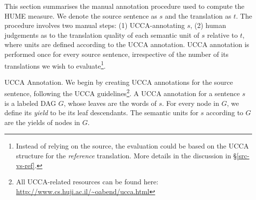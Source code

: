 \documentclass[11pt,letterpaper]{article}
\makeatletter
\renewcommand{\paragraph}{
  \@startsection{paragraph}{4}
  {\z@}{.1ex \@plus .1ex \@minus .1ex}{-1.5em}
  {\normalfont\normalsize\bfseries}
}
\newcommand{\secref}[1]{\S\ref{#1}}
\makeatother
\begin{document}
This section summarises the manual annotation procedure used
to compute the HUME measure. 
We denote the source sentence as $s$ and the translation as $t$. 
The procedure involves two manual steps: (1) UCCA-annotating $s$, 
(2) human judgements as to the translation quality of each semantic unit of $s$ relative to $t$,
where units are defined according to the UCCA annotation.
UCCA annotation is performed once for every source sentence,
irrespective of the number of its translations we wish
to evaluate\footnote{Instead of relying on the source,
the evaluation could be based on the UCCA structure for the \emph{reference}
translation.
More details in the discussion in \secref{src-vs-ref}.
}.

\paragraph{UCCA Annotation.}
We begin by creating UCCA annotations for the source sentence, following the
UCCA guidelines\footnote{All UCCA-related resources can be found
  here: \url{http://www.cs.huji.ac.il/~oabend/ucca.html}}.
A UCCA annotation for a sentence $s$ is a labeled DAG $G$, whose leaves
are the words of $s$.
For every node in $G$, we define its {\it yield} to be its leaf descendants.
The semantic units for $s$ according to $G$ are the yields of nodes in $G$. 

\end{document}
